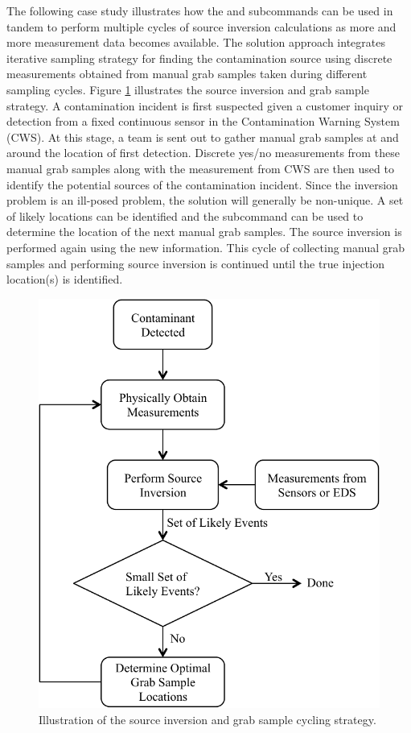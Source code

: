 \label{inversion_case_study}
The following case study illustrates how the  and  subcommands 
can be used in tandem to perform multiple cycles of source inversion calculations as more and more measurement data becomes available. 
The solution approach integrates iterative sampling strategy for finding the contamination source using discrete measurements 
obtained from manual grab samples taken during different sampling cycles.  
Figure \ref{fig:inversion_flowchart} illustrates the source inversion and grab sample strategy. 
A contamination incident is first suspected given a customer inquiry or detection from a fixed continuous 
sensor in the Contamination Warning System (CWS). 
At this stage, a team is sent out to gather manual grab samples at and around the location of first detection. 
Discrete yes/no measurements from these manual grab samples along with the measurement from CWS 
are then used to identify the potential sources of the contamination incident.
Since the inversion problem is an ill-posed problem, the solution will generally be non-unique. 
A set of likely locations can be identified and the  subcommand can be used 
to determine the location of the next manual grab samples. The source inversion is performed again using the new information. 
This cycle of collecting manual grab samples and performing source inversion is continued until the true injection location(s) is identified. 
\begin{figure}[!ht]
\begin{center}
\includegraphics[scale=0.6]{graphics/inversion_strategy.pdf}
\caption{Illustration of the source inversion and grab sample cycling strategy.}
\label{fig:inversion_flowchart}
\end{center}
\end{figure}

